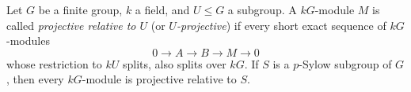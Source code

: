 Let $G$ be a finite group, $k$ a field, and $U \leq G$ a subgroup. A $kG$-module $M$ is called {\it projective relative to $U$} (or {\it $U$-projective}) if every short exact sequence of $kG$-modules
\[
0 \to A \to B \to M \to 0
\]
whose restriction to $kU$ splits, also splits over $kG$. If $S$ is a $p$-Sylow subgroup of $G$, then every $kG$-module is projective relative to $S$.
